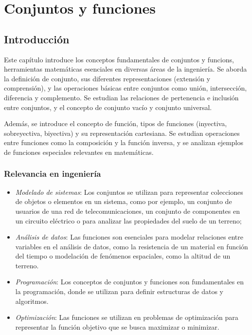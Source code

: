 \chapter{Conjuntos y funciones}

\section{Introducción}

Este capítulo introduce los conceptos fundamentales de \glspl{conjunto} y \glspl{funcion}, herramientas matemáticas esenciales en diversas áreas de la ingeniería. Se aborda la definición de conjunto, sus diferentes representaciones (extensión y comprensión), y las operaciones básicas entre conjuntos como unión, intersección, diferencia y complemento. Se estudian las relaciones de pertenencia e inclusión entre conjuntos, y el concepto de conjunto vacío y conjunto universal.

Además, se introduce el concepto de función, tipos de funciones (inyectiva, sobreyectiva, biyectiva) y su representación cartesiana. Se estudian operaciones entre funciones como la composición y la función inversa, y se analizan ejemplos de funciones especiales relevantes en matemáticas.


\subsection{Relevancia en ingeniería}

\begin{itemize}
	\item \textit{Modelado de sistemas}: Los conjuntos se utilizan para representar colecciones de objetos o elementos en un sistema, como por ejemplo, un conjunto de usuarios de una red de telecomunicaciones, un conjunto de componentes en un circuito eléctrico o para analizar las propiedades del suelo de un terreno;
	\item \textit{Análisis de datos}: Las funciones son esenciales para modelar relaciones entre variables en el análisis de datos, como la resistencia de un material en función del tiempo o modelación de fenómenos espaciales, como la altitud de un terreno.
	\item \textit{Programación}: Los conceptos de conjuntos y funciones son fundamentales en la programación, donde se utilizan para definir estructuras de datos y algoritmos.
	\item \textit{Optimización}: Las funciones se utilizan en problemas de optimización para representar la función objetivo que se busca maximizar o minimizar.
\end{itemize}

